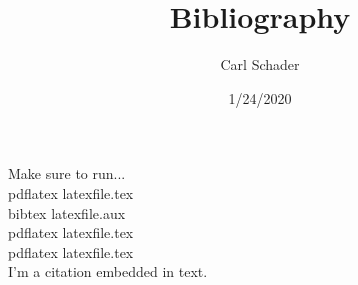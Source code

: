 \documentclass{article}
\title{Bibliography}
\date{1/24/2020}
\author{Carl Schader}
\begin{document}
	\maketitle
	Make sure to run...\\
	pdflatex latexfile.tex\\
	bibtex latexfile.aux\\
	pdflatex latexfile.tex\\
	pdflatex latexfile.tex\\
	I'm a citation \cite{DUMMY:1} embedded in text.

\end{document}
